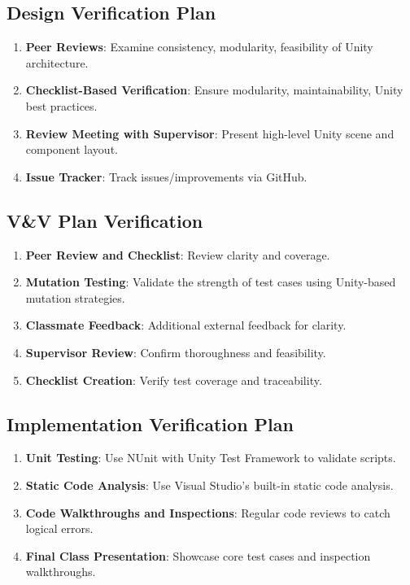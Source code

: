 \documentclass[12pt]{article}
\begin{document}
\subsection{Design Verification Plan}
\begin{enumerate}
    \item \textbf{Peer Reviews}: Examine consistency, modularity, feasibility of Unity architecture.
    \item \textbf{Checklist-Based Verification}: Ensure modularity, maintainability, Unity best practices.
    \item \textbf{Review Meeting with Supervisor}: Present high-level Unity scene and component layout.
    \item \textbf{Issue Tracker}: Track issues/improvements via GitHub.
\end{enumerate}

\subsection{V\&V Plan Verification}
\begin{enumerate}
    \item \textbf{Peer Review and Checklist}: Review clarity and coverage.
    \item \textbf{Mutation Testing}: Validate the strength of test cases using Unity-based mutation strategies.
    \item \textbf{Classmate Feedback}: Additional external feedback for clarity.
    \item \textbf{Supervisor Review}: Confirm thoroughness and feasibility.
    \item \textbf{Checklist Creation}: Verify test coverage and traceability.
\end{enumerate}

\subsection{Implementation Verification Plan}
\begin{enumerate}
    \item \textbf{Unit Testing}: Use NUnit with Unity Test Framework to validate scripts.
    \item \textbf{Static Code Analysis}: Use Visual Studio’s built-in static code analysis.
    \item \textbf{Code Walkthroughs and Inspections}: Regular code reviews to catch logical errors.
    \item \textbf{Final Class Presentation}: Showcase core test cases and inspection walkthroughs.
\end{enumerate}
\end{document}
